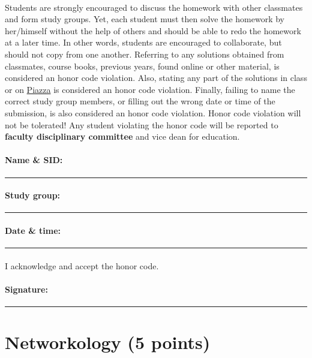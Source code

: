 \documentclass[11pt,a4paper]{article}
\newcommand{\totals}[1]{({\color{magenta}#1 points})}
\begin{document}
\paragraph{} Students are strongly encouraged to discuss the homework with other classmates and form study groups. Yet, each student must then solve the homework by her/himself without the help of others and should be able to redo the homework at a later time. In other words, students are encouraged to collaborate, but should not copy from one another. Referring to any solutions obtained from classmates, course books, previous years, found online or other material, is considered an honor code violation. Also, stating any part of the solutions in class or on \href{https://piazza.com/class/kkn1oz577n2sq}{Piazza} is considered an honor code violation. Finally, failing to name the correct study group members, or filling out the wrong date or time of the submission, is also considered an honor code violation. Honor code violation will not be tolerated! Any student violating the honor code will be reported to {\bf\color{LimeGreen} faculty disciplinary committee} and vice dean for education.

\vspace*{0.15in}
\paragraph{Name \& SID:} \rule{4.5in}{0.5pt}
\paragraph{Study group:} \rule{4.5in}{0.5pt}
\paragraph{Date \& time:} \rule{2.5in}{0.5pt}
\paragraph{} I acknowledge and accept the honor code.
\paragraph{Signature:} \rule{2.5in}{0.5pt}

\pagebreak

\section{Networkology \totals{5}}
\end{document}
